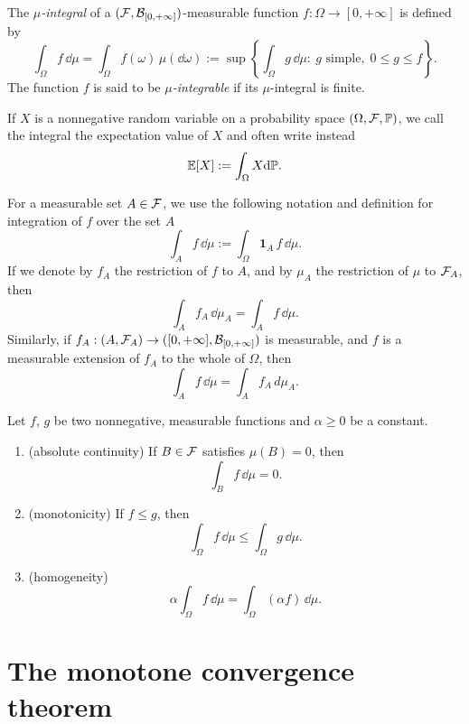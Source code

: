 \begin{definition}
	The \emph{$\mu$-integral} of a $(\mathcal F,\mathcal B_{[0,+\infty]})$-measurable function $f:\Omega\to[0,+\infty]$ is defined by
\[
	\int_\Omega f\, \dd \mu = \int_\Omega f(\omega)\,\mu(\dd\omega) := \sup\left\{ \int_\Omega g\, \dd \mu : \ g \text{ simple},\; 0 \leq g  \leq f \right\}.
\]
The function $f$ is said to be \emph{$\mu$-integrable} if its $\mu$-integral is finite.
\end{definition}

\begin{remark}
If $X$ is a nonnegative random variable on a probability space $(\Omega, \mathcal F, \mathbb P)$, we call the integral the expectation value of $X$ and often write instead
\[
	\mathbb E\!\left[X\right] := \int_\Omega X \mathrm{d} \mathbb P.
\]
\end{remark}

For a measurable set $A \in \mathcal F$, we use the following notation and definition for integration of $f$ over the set $A$
\[
	\int_A f\, \dd \mu := \int_\Omega \mathbf{1}_A\, f\, \dd \mu.
\]
If we denote by $f_A$ the restriction of $f$ to $A$, and by $\mu_A$ the restriction of $\mu$ to $\mathcal F_A$, then 
\[
\int_A f_A\,\dd \mu_A = \int_A f\, \dd \mu.
\]
Similarly, if $f_A:(A, \mathcal F_A) \to ([0,+\infty],\mathcal B_{[0,+\infty]})$ is measurable, and $f$ is a measurable extension of $f_A$ to the whole of $\Omega$, then
\[
	\int_A f\,\dd \mu = \int_A f_A\, d \mu_A.
\]

\begin{lemma}
	\label{pr:properties-integral-nonneg}
	Let $f$, $g$ be two nonnegative, measurable functions and $\alpha \geq 0$ be a constant.
	\begin{enumerate}
		\item (absolute continuity) If $B \in \mathcal F$ satisfies $\mu(B) = 0$, then
		\[
		\int_{B} f\, \dd \mu = 0. 
		\]
		\item (monotonicity) If $f \leq g$, then
		\[
		\int_\Omega f\, \dd \mu \leq \int_\Omega g\, \dd \mu.
		\]
		\item (homogeneity)
		\[
			\alpha \int_\Omega f\, \dd \mu = \int_\Omega (\alpha f )\,\dd \mu.
		\]
	\end{enumerate}
\end{lemma}


\section{The monotone convergence theorem}
\label{sec:monotone_convergence}

